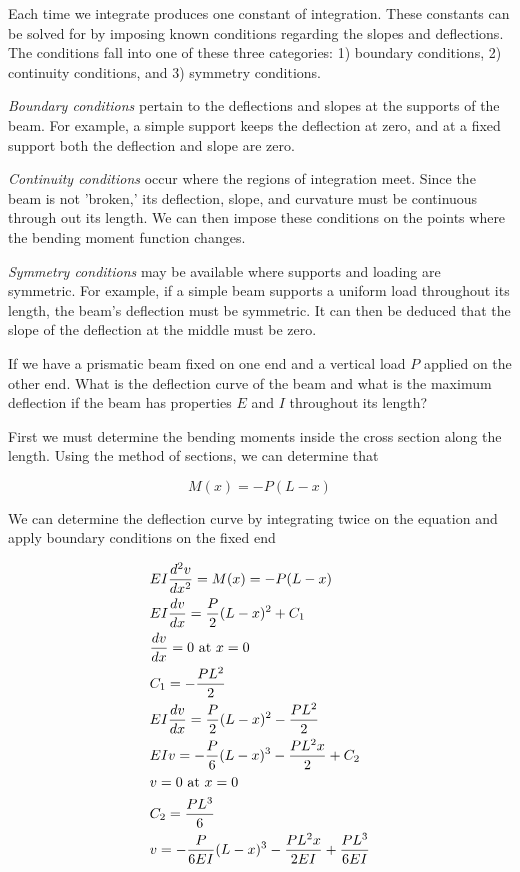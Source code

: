 \documentclass[a4paper,openany,12pt]{book}
\begin{document}
\begin{enumerate}
Each time we integrate produces one constant of integration. These
constants can be solved for by imposing known conditions regarding the
slopes and deflections. The conditions fall into one of these three
categories: 1) boundary conditions, 2) continuity conditions, and 3)
symmetry conditions.

\emph{Boundary conditions} pertain to the deflections and slopes at the
supports of the beam. For example, a simple support keeps the deflection
at zero, and at a fixed support both the deflection and slope are zero.

\emph{Continuity conditions} occur where the regions of integration meet.
Since the beam is not 'broken,' its deflection, slope, and curvature
must be continuous through out its length. We can then impose these
conditions on the points where the bending moment function changes.

\emph{Symmetry conditions} may be available where supports and loading are
symmetric. For example, if a simple beam supports a uniform load
throughout its length, the beam's deflection must be symmetric. It can
then be deduced that the slope of the deflection at the middle must be
zero.

If we have a prismatic beam fixed on one end and a vertical load \(P\)
applied on the other end. What is the deflection curve of the beam and
what is the maximum deflection if the beam has properties \(E\) and \(I\)
throughout its length?


First we must determine the bending moments inside the cross section
along the length. Using the method of sections, we can determine that

$$M(x) =  - P(L - x)$$

We can determine the deflection curve by integrating twice on the
equation and apply boundary conditions on the fixed end

$$\begin{gathered}
  EI\frac{d^2v}{dx^2} = M(x) =  - P(L - x) \hfill \\
  EI\frac{dv}{dx} = \frac{P}{2}(L - x)^2 + C_1 \hfill \\
  \frac{dv}{dx} = 0\text{ at }x = 0 \hfill \\
  C_1 =  -\frac{PL^2}{2} \hfill \\
  EI\frac{dv}{dx} = \frac{P}{2}(L - x)^2 - \frac{PL^2}{2} \hfill \\
  EIv =  -\frac{P}{6}(L - x)^3 -\frac{PL^2x}{2} + C_2 \hfill \\
  v = 0\text{ at }x = 0 \hfill \\
  C_2 = \frac{PL^3}{6} \hfill \\
  v =  -\frac{P}{6EI}(L - x)^3 -\frac{PL^2x}{2EI} + \frac{PL^3}{6EI} \hfill \\ 
\end{gathered}$$


\end{enumerate}
\end{document}
